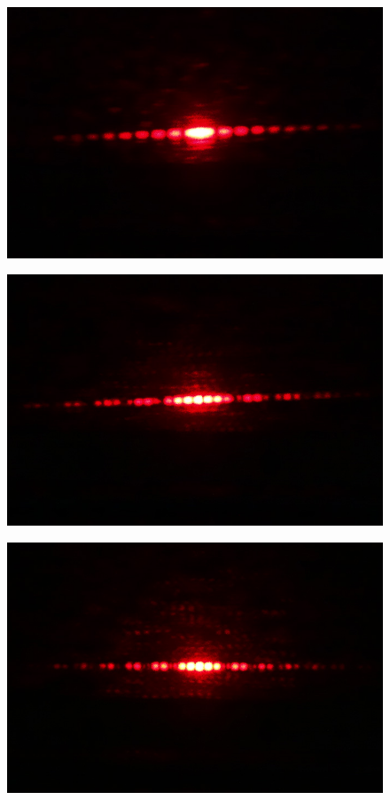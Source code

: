 \begin{figure}[htbp]
\begin{minipage}[ht]{0.48\hsize}
		\label{subfig:ss2_screen}
	\end{minipage}
	\begin{minipage}[ht]{0.48\hsize}\centering
		\includegraphics[width=\linewidth]{src/figures/result/SS3.JPG}
		\label{subfig:ss3_screen}
	\end{minipage}
	\begin{minipage}[ht]{0.48\hsize}\centering
		\includegraphics[width=\linewidth]{src/figures/result/DS1.JPG}
		\label{subfig:ds1_screen}
	\end{minipage}
	\begin{minipage}[ht]{0.48\hsize}\centering
		\includegraphics[width=\linewidth]{src/figures/result/DS2.JPG}

\end{minipage}
\end{figure}
